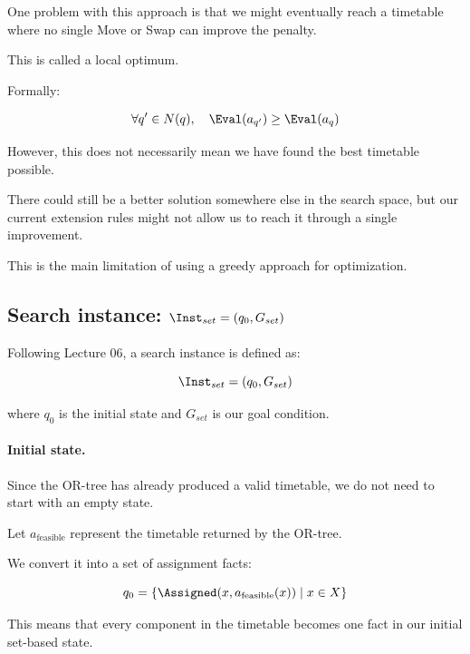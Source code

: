 One problem with this approach is that we might eventually reach a timetable where no single Move or Swap can improve the penalty.

This is called a local optimum.

Formally:

\begin{equation}
    \forall q'\in N(q),\quad
    \Eval(a_{q'})\geq\Eval(a_q)
\end{equation}

However, this does not necessarily mean we have found the best timetable possible.

There could still be a better solution somewhere else in the search space, but our current extension rules might not allow us to reach it through a single improvement.

This is the main limitation of using a greedy approach for optimization.

\subsection{Search instance: $\Inst_{set}=(q_0,G_{set})$}

Following Lecture 06, a search instance is defined as:

\begin{equation}
    \Inst_{set}=(q_0,G_{set})
\end{equation}

where $q_0$ is the initial state and $G_{set}$ is our goal condition.

\paragraph{Initial state.}

Since the OR-tree has already produced a valid timetable, we do not need to start with an empty state.

Let $a_{\mathrm{feasible}}$ represent the timetable returned by the OR-tree.

We convert it into a set of assignment facts:

\begin{equation}
    q_0=
    \{\Assigned(x,a_{\mathrm{feasible}}(x))
    \mid x\in X\}
\end{equation}

This means that every component in the timetable becomes one fact in our initial set-based state.


